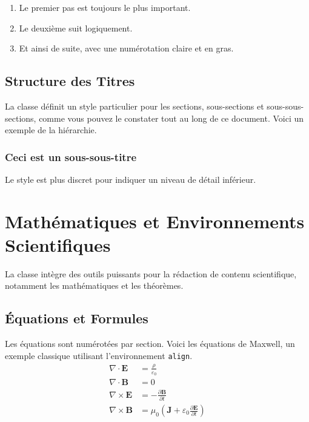 \documentclass{mytex}
\begin{document}
	\begin{enumerate}
		\item Le premier pas est toujours le plus important.
		\item Le deuxième suit logiquement.
		\item Et ainsi de suite, avec une numérotation claire et en gras.
	\end{enumerate}
	
	\subsection{Structure des Titres}
	La classe définit un style particulier pour les sections, sous-sections et sous-sous-sections, comme vous pouvez le constater tout au long de ce document. Voici un exemple de la hiérarchie.
	
	\subsubsection{Ceci est un sous-sous-titre}
	Le style est plus discret pour indiquer un niveau de détail inférieur.
	
	
	\section{Mathématiques et Environnements Scientifiques}
	La classe intègre des outils puissants pour la rédaction de contenu scientifique, notamment les mathématiques et les théorèmes.
	
	\subsection{Équations et Formules}
	
	Les équations sont numérotées par section. Voici les équations de Maxwell, un exemple classique utilisant l'environnement \texttt{align}.
	\begin{align}
		\nabla \cdot \mathbf{E} &= \frac{\rho}{\varepsilon_0} \label{eq:maxwell1} \\
		\nabla \cdot \mathbf{B} &= 0 \label{eq:maxwell2} \\
		\nabla \times \mathbf{E} &= -\frac{\partial \mathbf{B}}{\partial t} \label{eq:maxwell3} \\
		\nabla \times \mathbf{B} &= \mu_0 \left( \mathbf{J} + \varepsilon_0 \frac{\partial \mathbf{E}}{\partial t} \right) \label{eq:maxwell4}
	\end{align}
	
\end{document}

